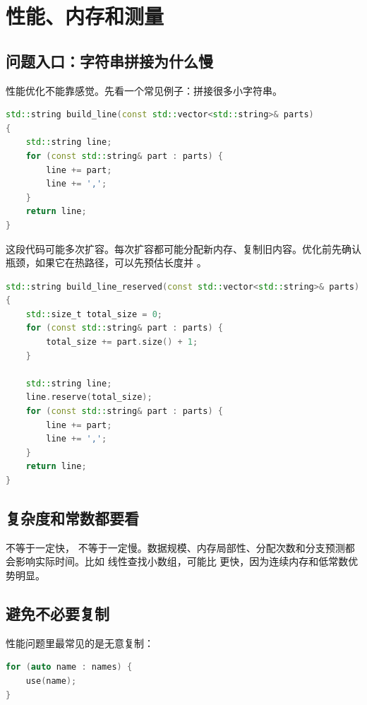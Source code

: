 \chapter{性能、内存和测量}

\section{问题入口：字符串拼接为什么慢}

性能优化不能靠感觉。先看一个常见例子：拼接很多小字符串。

\begin{lstlisting}[language=C++,caption={反复拼接可能频繁分配}]
std::string build_line(const std::vector<std::string>& parts)
{
    std::string line;
    for (const std::string& part : parts) {
        line += part;
        line += ',';
    }
    return line;
}
\end{lstlisting}

这段代码可能多次扩容。每次扩容都可能分配新内存、复制旧内容。优化前先确认瓶颈，如果它在热路径，可以先预估长度并 。

\begin{lstlisting}[language=C++,caption={预留容量减少分配}]
std::string build_line_reserved(const std::vector<std::string>& parts)
{
    std::size_t total_size = 0;
    for (const std::string& part : parts) {
        total_size += part.size() + 1;
    }

    std::string line;
    line.reserve(total_size);
    for (const std::string& part : parts) {
        line += part;
        line += ',';
    }
    return line;
}
\end{lstlisting}

\section{复杂度和常数都要看}

 不等于一定快， 不等于一定慢。数据规模、内存局部性、分配次数和分支预测都会影响实际时间。比如  线性查找小数组，可能比  更快，因为连续内存和低常数优势明显。

\section{避免不必要复制}

性能问题里最常见的是无意复制：

\begin{lstlisting}[language=C++,caption={range-for 中复制字符串}]
for (auto name : names) {
    use(name);
}
\end{lstlisting}

